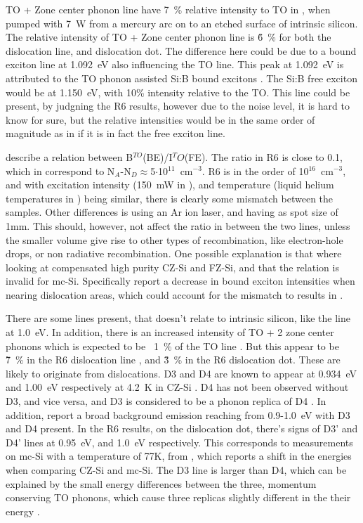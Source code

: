 TO + Zone center phonon line have 7~\% relative intensity to TO in \cite{dean67}, when pumped with 7~W from a mercury arc on to an etched surface of intrinsic silicon. The relative intensity of TO + Zone center phonon line is \~6~\% for both the dislocation line, and dislocation dot. The difference here could be due to a bound exciton line at 1.092~eV also influencing the TO line. This peak at 1.092~eV is attributed to the TO phonon assisted Si:B bound excitons \cite{sauer73}. The Si:B free exciton would be at 1.150~eV, with 10\% intensity relative to the TO. This line could be present, by judgning the R6 results, however due to the noise level, it is hard to know for sure, but the relative intensities would be in the same order of magnitude as in \cite{sauer73} if it is in fact the free exciton line.


\cite{tajima78} describe a relation between B$^{TO}$(BE)/I$^TO$(FE). The ratio in R6 is close to 0.1, which in \cite{tajima78} correspond to N$_A$-N$_D\approx$5$\cdot$10$^{11}$~cm$^{-3}$. R6 is in the order of 10$^{16}$~cm$^{-3}$, and with excitation intensity (150~mW in \cite{tajima78}), and temperature (liquid helium temperatures in \cite{tajima78}) being similar, there is clearly some mismatch between the samples. Other differences is \cite{tajima78} using an Ar ion laser, and having as spot size of 1mm. This should, however, not affect the ratio in between the two lines, unless the smaller volume give rise to other types of recombination, like electron-hole drops, or non radiative recombination. One possible explanation is that \cite{tajima78} where looking at compensated high purity CZ-Si and FZ-Si, and that the relation is invalid for mc-Si. Specifically \cite{drozdov76} report a decrease in bound exciton intensities when nearing dislocation areas, which could account for the mismatch to results in \cite{tajima78}.


There are some lines present, that doesn't relate to intrinsic silicon, like the line at 1.0~eV. In addition, there is an increased intensity of TO + 2 zone center phonons which is expected to be ~1~\% of the TO line \cite{dean67}. But this appear to be \~7~\% in the R6 dislocation line , and \~3~\% in the R6 dislocation dot. These are likely to originate from dislocations. D3 and D4 are known to appear at 0.934~eV and 1.00~eV respectively at 4.2~K in CZ-Si \cite{drozdov76}. D4 has not been observed without D3, and vice versa, and D3 is considered to be a phonon replica of D4 \cite{kveder95}. In addition, \cite{tajima95} report a broad background emission reaching from 0.9-1.0~eV with D3 and D4 present. In the R6 results, on the dislocation dot, there's signs of D3' and D4' lines at 0.95~eV, and 1.0~eV respectively. This corresponds to measurements on mc-Si with a temperature of 77K, from \cite{tarasov00}, which reports a shift in the energies when comparing CZ-Si and mc-Si. The D3 line is larger than D4, which can be explained by the small energy differences between the three, momentum conserving TO phonons, which cause three replicas slightly different in the their energy \cite{arguirov07}.

